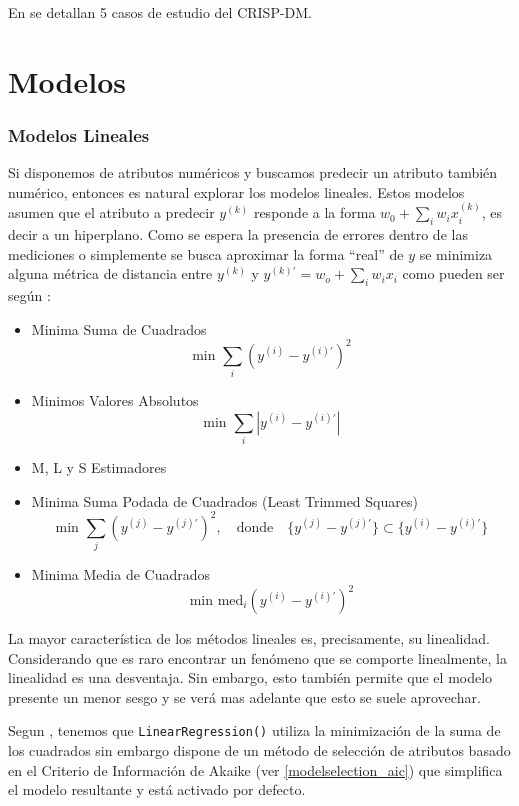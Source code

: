 \documentclass[10pt,a4paper]{article}
\begin{document}
En \cite{larose2014discovering} se detallan 5 casos de estudio del CRISP-DM.

\section{}


\part{Modelos}
\section{Modelos Lineales}
Si disponemos de atributos numéricos y buscamos predecir un atributo también numérico, entonces es natural explorar los modelos lineales. Estos modelos asumen que el atributo a predecir $y^{(k)}$ responde a la forma $w_0 + \sum_i w_ix_i^{(k)}$, es decir a un hiperplano. Como se espera la presencia de errores dentro de las mediciones o simplemente se busca aproximar la forma ``real'' de $y$ se minimiza alguna métrica de distancia entre $y^{(k)}$ y $y^{(k)'} = w_o + \sum_i w_ix_i$ como pueden ser según \cite{ruppert1980trimmed}:

\begin{itemize}
\item Minima Suma de Cuadrados
  \[
  \text{min }\sum_i (y^{(i)}-y^{(i)'})^2
  \]
\item Minimos Valores Absolutos
  \[
  \text{min }\sum_i |y^{(i)}-y^{(i)'}|
  \]
\item M, L y S Estimadores
\item Minima Suma Podada de Cuadrados (Least Trimmed Squares)
  \[
  \text{min }\sum_j (y^{(j)}-y^{(j)'})^2, \quad \text{donde} \quad \{ y^{(j)}-y^{(j)'} \} \subset \{ y^{(i)}-y^{(i)'} \}
  \]
\item Minima Media de Cuadrados
  \[
  \text{min }\text{med}_i (y^{(i)}-y^{(i)'})^2
  \]
\end{itemize}

La mayor característica de los métodos lineales es, precisamente, su linealidad. Considerando que es raro encontrar un fenómeno que se comporte linealmente, la linealidad es una desventaja. Sin embargo, esto también permite que el modelo presente un menor sesgo y se verá mas adelante que esto se suele aprovechar.


Segun \cite{witten2011data}, tenemos que \lstinline{LinearRegression()} utiliza la minimización de la suma de los cuadrados sin embargo dispone de un método de selección de atributos basado en el Criterio de Información de Akaike (ver \ref{modelselection_aic}) que simplifica el modelo resultante y está activado por defecto.
\end{document}
